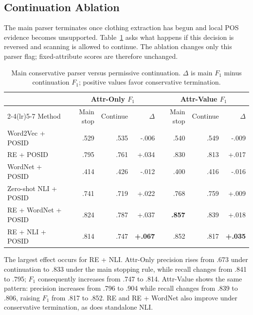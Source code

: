 \documentclass[sigconf,nonacm]{acmart}
\newcommand{\posid}{\textsc{POSID}}
\begin{document}
\subsection{Continuation Ablation}
\label{subsec:results-early-stop}

The main parser terminates once clothing extraction has begun and local POS
evidence becomes unsupported.  Table~\ref{tab:early-stop-ablation} asks what
happens if this decision is reversed and scanning is allowed to continue.  The
ablation changes only this parser flag; fixed-attribute scores are therefore
unchanged.

\begin{table}[t]
    \centering
    \caption{Main conservative parser versus permissive continuation.  $\Delta$
    is main $F_1$ minus continuation $F_1$; positive values favor conservative
    termination.}
    \label{tab:early-stop-ablation}
    \small
    \begin{tabular}{lrrrrrr}
        \toprule
        & \multicolumn{3}{c}{Attr-Only $F_1$} & \multicolumn{3}{c}{Attr-Value $F_1$} \\
        \cmidrule(lr){2-4}\cmidrule(lr){5-7}
        Method & Main stop & Continue & $\Delta$ & Main stop & Continue & $\Delta$ \\
        \midrule
        Word2Vec + \posid{} & .529 & .535 & -.006 & .540 & .549 & -.009 \\
        RE + \posid{} & .795 & .761 & +.034 & .830 & .813 & +.017 \\
        WordNet + \posid{} & .414 & .426 & -.012 & .400 & .416 & -.016 \\
        Zero-shot NLI + \posid{} & .741 & .719 & +.022 & .768 & .759 & +.009 \\
        RE + WordNet + \posid{} & .824 & .787 & +.037 & \textbf{.857} & .839 & +.018 \\
        RE + NLI + \posid{} & .814 & .747 & \textbf{+.067} & .852 & .817 & \textbf{+.035} \\
        \bottomrule
    \end{tabular}
\end{table}

The largest effect occurs for RE + NLI.  Attr-Only precision rises from .673
under continuation to .833 under the main stopping rule, while recall changes
from .841 to .795; $F_1$ consequently increases from .747 to .814.  Attr-Value
shows the same pattern: precision increases from .796 to .904 while recall
changes from .839 to .806, raising $F_1$ from .817 to .852.  RE and RE +
WordNet also improve under conservative termination, as does standalone NLI.
\end{document}
